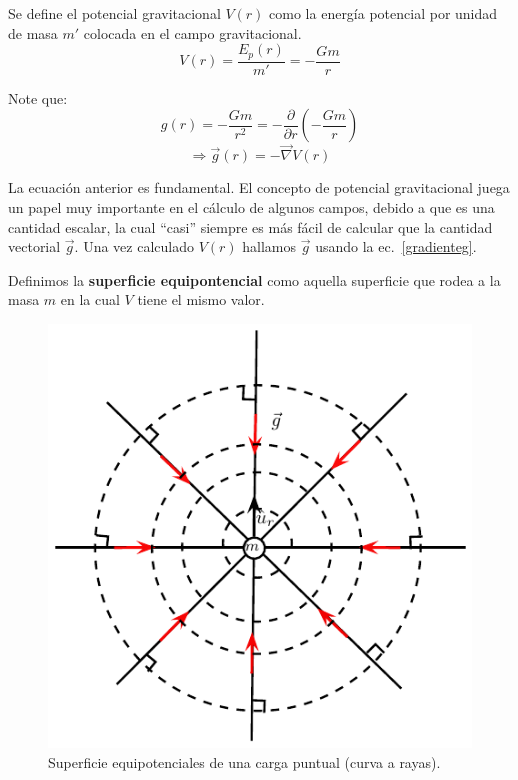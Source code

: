 Se define el potencial gravitacional $V(r)$ como la energía potencial por unidad de masa $m'$ colocada en el campo gravitacional.
\begin{equation}
\boxed{V(r)=\dfrac{E_p(r)}{m'}= -\dfrac{Gm}{r}}
\end{equation}

Note que: 
\begin{displaymath}
g(r)=-\dfrac{Gm}{r^2}=-\dfrac{\partial}{\partial r}(-\dfrac{Gm}{r})
\end{displaymath}
\begin{equation}
\Rightarrow \boxed{ \vec{g}(r)= -\vec{\nabla}V(r) }
\label{gradienteg}
\end{equation}

La ecuación anterior es fundamental. El concepto de potencial gravitacional juega un papel muy importante en el cálculo de algunos campos, debido a que es una cantidad escalar, la cual ``casi'' siempre es más fácil de calcular que la cantidad vectorial $\vec{g}$. Una vez calculado $V(r)$ hallamos $\vec{g}$ usando la ec.~\eqref{gradienteg}. 

Definimos la \textbf{superficie equipontencial} como aquella superficie que rodea a la masa $m$ en la cual $V$ tiene el mismo valor.

\begin{figure}[h]
\begin{center}
\includegraphics[scale=0.8]{gravitacion/superficie}
\caption{Superficie equipotenciales de una carga puntual (curva a rayas).}
\label{superficie-equipotencial}
\end{center}
\end{figure}

